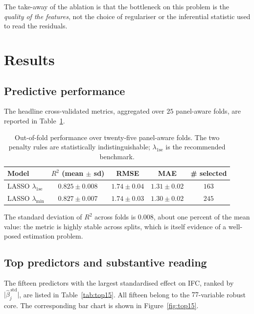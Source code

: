 \documentclass[11pt,a4paper]{article}
\begin{document}
The take-away of the ablation is that the bottleneck on this problem
is the \emph{quality of the features}, not the choice of regulariser
or the inferential statistic used to read the residuals.

\section{Results}
\label{sec:results}

\subsection{Predictive performance}

The headline cross-validated metrics, aggregated over \(25\)
panel-aware folds, are reported in Table~\ref{tab:cv}.

\begin{table}[h!]
  \centering
  \begin{tabular}{lcccc}
    \toprule
    Model & \(R^{2}\) (mean \(\pm\) sd) & RMSE & MAE & \# selected \\
    \midrule
    LASSO \(\lambda_{\mathrm{1se}}\) & \(0.825 \pm 0.008\) &
      \(1.74 \pm 0.04\) & \(1.31 \pm 0.02\) & \(163\) \\
    LASSO \(\lambda_{\min}\)         & \(0.827 \pm 0.007\) &
      \(1.74 \pm 0.03\) & \(1.30 \pm 0.02\) & \(245\) \\
    \bottomrule
  \end{tabular}
  \caption{Out-of-fold performance over twenty-five panel-aware folds.
    The two penalty rules are statistically indistinguishable;
    \(\lambda_{\mathrm{1se}}\) is the recommended benchmark.}
  \label{tab:cv}
\end{table}

The standard deviation of \(R^{2}\) across folds is \(0.008\), about
one percent of the mean value: the metric is highly stable across
splits, which is itself evidence of a well-posed estimation problem.

\subsection{Top predictors and substantive reading}

The fifteen predictors with the largest standardised effect on IFC,
ranked by \(\bigl|\hat\beta_{j}^{\,\text{std}}\bigr|\), are listed in
Table~\ref{tab:top15}. All fifteen belong to the
\(77\)-variable robust core. The corresponding bar chart is shown in
Figure~\ref{fig:top15}.
\end{document}
